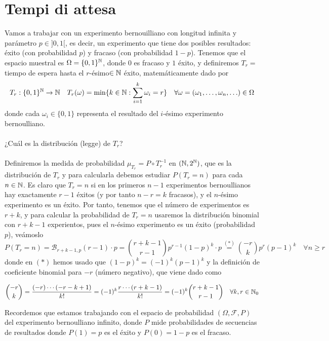 \section{Tempi di attesa}
Vamos a trabajar con un experimento bernouilliano con longitud infinita y parámetro $p\in]0,1[$, es decir, un experimento que tiene dos posibles resultados: éxito (con probabilidad $p$) y fracaso (con probabilidad $1-p$). Tenemos que el espacio muestral es $\Omega=\{0,1\}^{\mathbb{N}}$, donde $0$ es fracaso y $1$ éxito, y definiremos $T_r=$ tiempo de espera hasta el $r$-ésimo$\in \mathbb{N}$ éxito, matemáticamente dado por
\begin{equation*}
    T_r:\{0,1\}^{\mathbb{N}}\to \mathbb{N} \quad T_r(\omega) = \min\{k\in \mathbb{N}: \sum_{i=1}^k \omega_i = r\} \quad \forall \omega=(\omega_1, \ldots, \omega_n, \ldots) \in \Omega
\end{equation*}
donde cada $\omega_i \in \{0,1\}$ representa el resultado del $i$-ésimo experimento bernoulliano. \\ \\
\noindent
{} ¿Cuál es la distribución (legge) de $T_r$? \\ \\
\noindent
Definiremos la medida de probabilidad $\mu_{T_r} = P \circ T_r^{-1}$ en $(\mathbb{N}, 2^{\mathbb{N}})$, que es la distribución de $T_r$ y para calcularla debemos estudiar $P(T_r=n)$ para cada $n\in \mathbb{N}$. Es claro que $T_r=n$ si en los primeros $n-1$ experimentos bernoullianos hay exactamente $r-1$ éxitos (y por tanto $n-r=k$ fracasos), y el $n$-ésimo experimento es un éxito. Por tanto, tenemos que el número de experimentos es $r+k$, y para calcular la probabilidad de $T_r=n$ usaremos la distribución binomial con $r+k-1$ experientos, pues el $n$-ésimo experimento es un éxito (probabilidad $p$), veámoslo
\begin{equation*}
    P(T_r=n) = \mathcal{B}_{r+k-1,p}(r-1) \cdot p = \binom{r+k-1}{r-1} p^{r-1} (1-p)^{k} \cdot p \overset{(*)}{=} \binom{-r}{k} p^r (p-1)^k\quad \forall n \geq r
\end{equation*}
donde en $(*)$ hemos usado que $(1-p)^k = (-1)^k (p-1)^k$ y la definición de coeficiente binomial para $-r$ (número negativo), que viene dado como

\begin{equation*}
    \binom{-r}{k} = \dfrac{(-r)\cdots(-r-k+1)}{k!}=(-1)^k \dfrac{r \cdots (r+k-1)}{k!}=(-1)^k \binom{r+k-1}{r-1}  \quad \forall k, r \in \mathbb{N}_0
\end{equation*}

\begin{observacion}
    Recordemos que estamos trabajando con el espacio de probabilidad $(\Omega, \mathcal{F}, P)$ del experimento bernoulliano infinito, donde $P$ mide probabilidades de secuencias de resultados donde $P(1)=p$ es el éxito y $P(0)=1-p$ es el fracaso.
\end{observacion}

